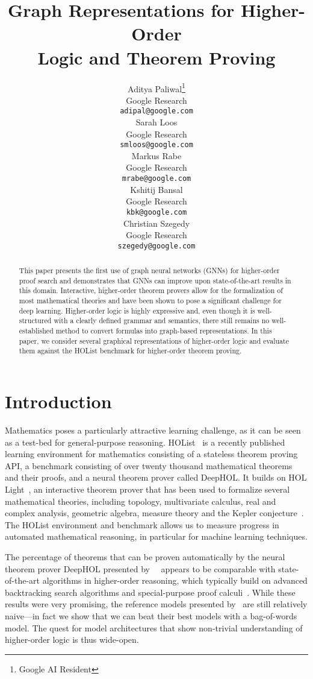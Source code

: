 \documentclass[letterpaper]{article} \usepackage{aaai20}  \usepackage{times}  \usepackage{helvet} \usepackage{courier}  \usepackage[hyphens]{url}  \usepackage{graphicx} \urlstyle{rm} \def\UrlFont{\rm}  \usepackage{graphicx}  \frenchspacing  \setlength{\pdfpagewidth}{8.5in}  \setlength{\pdfpageheight}{11in}
\title{Graph Representations for Higher-Order \\ Logic and Theorem Proving}
\author{
  Aditya Paliwal\thanks{Google AI Resident} \\
  Google Research \\
  \texttt{adipal@google.com} \\
  \And
  Sarah Loos\\
  Google Research \\
  \texttt{smloos@google.com} \\
  \And
  Markus Rabe\\
  Google Research \\
  \texttt{mrabe@google.com} \\
  \AND
  Kshitij Bansal\\
  Google Research \\
  \texttt{kbk@google.com} \\
  \And
  Christian Szegedy\\
  Google Research \\
  \texttt{szegedy@google.com} \\
}
\newcommand{\citet}[1]{\citeauthor{#1}~\shortcite{#1}}
\newcommand{\citep}{\cite}
\begin{document}
\maketitle

\begin{abstract}
This paper presents the first use of graph neural networks (GNNs) for higher-order proof search and demonstrates that GNNs can improve upon state-of-the-art results in this domain. Interactive, higher-order theorem provers allow for the formalization of most mathematical theories and have been shown to pose a significant challenge for deep learning. Higher-order logic is highly expressive and, even though it is well-structured with a clearly defined grammar and semantics, there still remains no well-established method to convert formulas into graph-based representations. In this paper, we consider several graphical representations of higher-order logic and evaluate them against the HOList benchmark for higher-order theorem proving.
\end{abstract}

\section{Introduction}
\label{sec:intro}

Mathematics poses a particularly attractive learning challenge, as it can be seen as a test-bed for general-purpose reasoning.
HOList~\citep{bansal2019holist} is a recently published learning environment for mathematics consisting of a stateless theorem proving API, a benchmark consisting of over twenty thousand mathematical theorems and their proofs, and a neural theorem prover called DeepHOL.
It builds on HOL Light~\citep{Harrison96}, an interactive theorem prover that has been used to formalize several mathematical theories, including topology, multivariate calculus, real and complex analysis, geometric algebra, measure theory and the Kepler conjecture~\citep{hales2017formal}.
The HOList environment and benchmark allows us to measure progress in automated mathematical reasoning, in particular for machine learning techniques.

The percentage of theorems that can be proven automatically by the neural theorem prover DeepHOL presented by~\citet{bansal2019holist} appears to be comparable with state-of-the-art algorithms in higher-order reasoning, which typically build on advanced backtracking search algorithms and special-purpose proof calculi~\citep{kaliszyk2014learning,bentkamp2018superpositionforlambdafreehigherorderlogic}.
While these results were very promising, the reference models presented by~\cite{bansal2019holist} are still relatively naive---in fact we show that we can beat their best models with a bag-of-words model.
The quest for model architectures that show non-trivial understanding of higher-order logic is thus wide-open.
\end{document}
